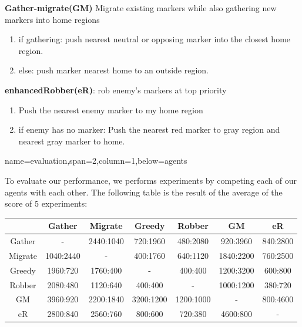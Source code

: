 \documentclass[a1paper,portrait]{baposter}
\begin{document}
\begin{poster}
{\textbf{Gather-migrate(GM)} Migrate existing markers while also gathering new markers into home regions
\vspace{-0.6em}			%
\begin{enumerate} \itemsep0pt \parskip0pt 
  \item if gathering:
push nearest neutral or opposing marker into the closest home region.
  \item else:
push marker nearest home to an outside region.
\end{enumerate}
\vspace{-0.6em}

\textbf{enhancedRobber(eR)}: rob enemy's markers at top priority
\vspace{-0.6em}			%
\begin{enumerate} \itemsep0pt \parskip0pt 
  \item Push the nearest enemy marker to my home region
  \item if enemy has no marker:  Push the nearest red marker to gray region and
      nearest gray marker to home.
\end{enumerate}
\vspace{-0.5em}
}

{name=evaluation,span=2,column=1,below=agents}{
\vspace{-0.2em}
To evaluate our performance, we performs experiments by competing each of
our agents with each other. The following table is the result of the average of the score of
5 experiments:
\begin{center}
    \smaller[3]
    \begin{tabular}{ | c | c | c | c | c | c | c |}
    \hline
           & Gather       & Migrate   & Greedy   & Robber    & GM        & eR \\ \hline
    Gather & -            & 2440:1040 & 720:1960 & 480:2080  & 920:3960  & 840:2800  \\ \hline
    Migrate& 1040:2440    & -         & 400:1760 & 640:1120  & 1840:2200 & 760:2500  \\ \hline
    Greedy & 1960:720     & 1760:400  & -        & 400:400   & 1200:3200 & 600:800   \\ \hline
    Robber & 2080:480     & 1120:640  & 400:400  & -         & 1000:1200 & 380:720   \\ \hline
    GM     & 3960:920     & 2200:1840 & 3200:1200& 1200:1000 & -         & 800:4600\\ \hline
    eR     & 2800:840     & 2560:760  & 800:600  & 720:380   & 4600:800  & - \\ \hline
    \end{tabular}
\end{center}
}


\end{poster}
\end{document}
